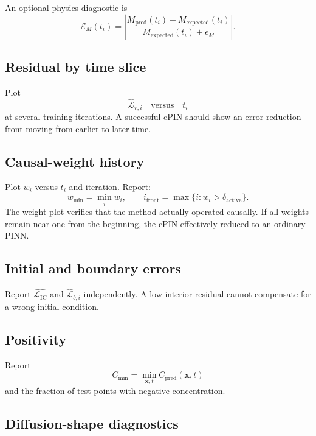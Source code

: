 \documentclass[11pt]{article}
\newcommand{\xv}{\bm{x}}
\newcommand{\Lic}{\mathcal{L}_{\mathrm{IC}}}
\begin{document}
An optional physics diagnostic is
\begin{equation}
\mathcal{E}_M(t_i)
=
\left|
\frac{
M_{\mathrm{pred}}(t_i)-M_{\mathrm{expected}}(t_i)
}{
M_{\mathrm{expected}}(t_i)+\epsilon_M
}
\right|.
\end{equation}

\subsection{Residual by time slice}

Plot
\begin{equation}
\widehat{\mathcal{L}}_{r,i}
\quad\text{versus}\quad t_i
\end{equation}
at several training iterations. A successful cPIN should show an error-reduction front moving from earlier to later time.

\subsection{Causal-weight history}

Plot $w_i$ versus $t_i$ and iteration. Report:
\begin{equation}
w_{\min}=\min_i w_i,
\qquad
i_{\mathrm{front}}
=
\max\{i:w_i>\delta_{\mathrm{active}}\}.
\end{equation}
The weight plot verifies that the method actually operated causally. If all weights remain near one from the beginning, the cPIN effectively reduced to an ordinary PINN.

\subsection{Initial and boundary errors}

Report $\widehat{\Lic}$ and $\widehat{\mathcal{L}}_{b,i}$ independently. A low interior residual cannot compensate for a wrong initial condition.

\subsection{Positivity}

Report
\begin{equation}
C_{\min}
=
\min_{\xv,t}C_{\mathrm{pred}}(\xv,t)
\end{equation}
and the fraction of test points with negative concentration.

\subsection{Diffusion-shape diagnostics}
\end{document}
